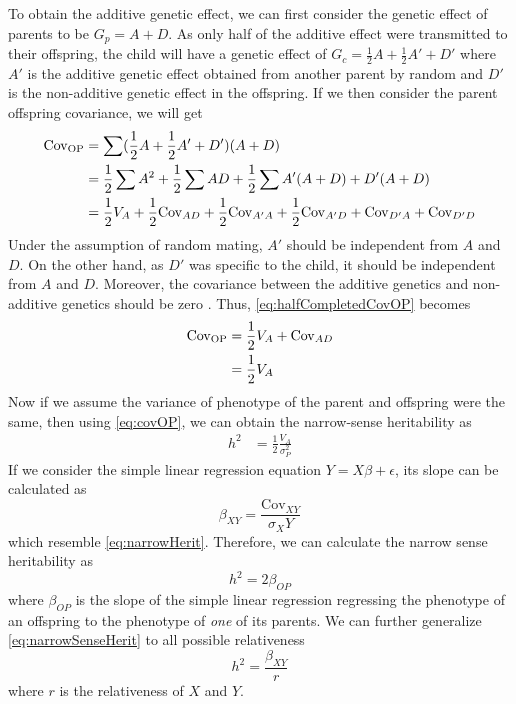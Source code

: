 	To obtain the additive genetic effect, we can first consider the genetic effect of parents to be $G_p=A+D$. 
	As only half of the additive effect were transmitted to their offspring, the child will have a genetic effect of $G_c=\frac{1}{2}A+\frac{1}{2}A'+D'$ where $A'$ is the additive genetic effect obtained from another parent by random and $D'$ is the non-additive genetic effect in the offspring.
	If we then consider the parent offspring covariance, we will get
	\begin{align}
	\mathrm{Cov_{OP}}&= \sum(\frac{1}{2}A+\frac{1}{2}A'+D')(A+D)\notag\\
	&=\frac{1}{2}\sum A^2+\frac{1}{2}\sum AD + \frac{1}{2}\sum A'(A+D) +D'(A+D) \notag\\ 
	&=\frac{1}{2}V_A+ \frac{1}{2}\mathrm{Cov}_{AD} + \frac{1}{2}\mathrm{Cov}_{A'A} + \frac{1}{2}\mathrm{Cov}_{A'D} +\mathrm{Cov}_{D'A} +\mathrm{Cov}_{D'D}  
	\label{eq:halfCompletedCovOP}
	\end{align} 
	Under the assumption of random mating,  $A'$ should be independent from $A$ and $D$. 
	On the other hand, as $D'$ was specific to the child, it should be independent from $A$ and $D$.
	Moreover, the covariance between the additive genetics and non-additive genetics should be zero \citep{Falconer1996}.
	Thus, \cref{eq:halfCompletedCovOP} becomes
	\begin{align}
	\mathrm{Cov_{OP}} &= \frac{1}{2}V_A+\mathrm{Cov}_{AD} \notag\\
	&= \frac{1}{2}V_A
	\label{eq:covOP}
	\end{align}
	Now if we assume the variance of phenotype of the parent and offspring were the same, then using \cref{eq:covOP}, we can obtain the narrow-sense heritability as
	\begin{align}
	h^2 &= \frac{1}{2}\frac{V_A}{\sigma_P^2}
	\label{eq:narrowHerit}
	\end{align}
	If we consider the simple linear regression equation $Y=X\beta+\epsilon$, its slope can be calculated as 
	\begin{equation}
	\beta_{XY} = \frac{\mathrm{Cov}_{XY}}{\sigma_{X}{Y}}
	\end{equation}
	which resemble \cref{eq:narrowHerit}. 
	Therefore,  we can calculate the narrow sense heritability as
	\begin{equation}
	h^2 = 2\beta_{OP}
	\label{eq:narrowSenseHerit}
	\end{equation}
	where $\beta_{OP}$ is the slope of the simple linear regression regressing the phenotype of an offspring to the phenotype of \emph{one} of its parents.
	We can further generalize \cref{eq:narrowSenseHerit} to all possible relativeness 
	\begin{equation}
	h^2=\frac{\beta_{XY}}{r}
	\label{eq:finalNarrow}
	\end{equation}
	where $r$ is the relativeness of $X$ and $Y$.
	
